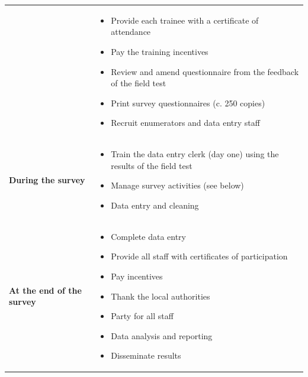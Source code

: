 \documentclass[12pt,a4paper]{book}
\providecommand{\tightlist}{%
  \setlength{\itemsep}{0pt}\setlength{\parskip}{0pt}}
\theoremstyle{definition}
\theoremstyle{definition}
\theoremstyle{definition}
\theoremstyle{remark}
\begin{document}
\begin{longtable}[]{@{}ll@{}}
\begin{minipage}[t]{0.48\columnwidth}
\end{minipage} & \begin{minipage}[t]{0.48\columnwidth}\raggedright
\begin{itemize}
\tightlist
\item
  Provide each trainee with a certificate of attendance
\item
  Pay the training incentives
\item
  Review and amend questionnaire from the feedback of the field test
\item
  Print survey questionnaires (c. 250 copies)
\item
  Recruit enumerators and data entry staff
\end{itemize}\strut
\end{minipage}\tabularnewline
\begin{minipage}[t]{0.48\columnwidth}\raggedright
\textbf{During the survey}\strut
\end{minipage} & \begin{minipage}[t]{0.48\columnwidth}\raggedright
\begin{itemize}
\tightlist
\item
  Train the data entry clerk (day one) using the results of the field
  test
\item
  Manage survey activities (see below)
\item
  Data entry and cleaning
\end{itemize}\strut
\end{minipage}\tabularnewline
\begin{minipage}[t]{0.48\columnwidth}\raggedright
\textbf{At the end of the survey}\strut
\end{minipage} & \begin{minipage}[t]{0.48\columnwidth}\raggedright
\begin{itemize}
\tightlist
\item
  Complete data entry
\item
  Provide all staff with certificates of participation
\item
  Pay incentives
\item
  Thank the local authorities
\item
  Party for all staff
\item
  Data analysis and reporting
\item
  Disseminate results
\end{itemize}\strut
\end{minipage}\tabularnewline
\bottomrule
\end{longtable}
\end{document}
